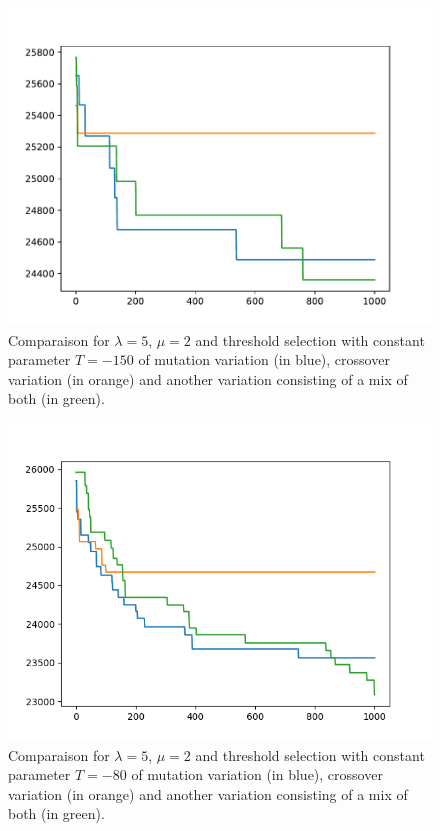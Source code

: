 \documentclass{article}
\theoremstyle{plain} %
\theoremstyle{definition} %
\begin{document}
\begin{center}
\begin{figure}
\centering
\includegraphics[scale=.6]{Plots_Antoine/new/5,2,mutcmul,threshold-150.pdf}
\caption{Comparaison for $\lambda = 5$, $\mu = 2$ and threshold selection with
constant parameter $T = -150$ of mutation variation (in blue), crossover
variation (in orange) and another variation consisting of a mix of both (in
green).}
\label{Thresholdcomparevariation}
\end{figure}
\end{center}

\begin{figure}
\centering
\includegraphics[scale=.6]{Plots_Antoine/new/5,2,mutcmul,Threshold-80.png}
\caption{Comparaison for $\lambda = 5$, $\mu = 2$ and threshold selection with
constant parameter $T = -80$ of mutation variation (in blue), crossover
variation (in orange) and another variation consisting of a mix of both (in
green).}
\label{Threshold-80comparevariation}
\end{figure}
\end{document}
